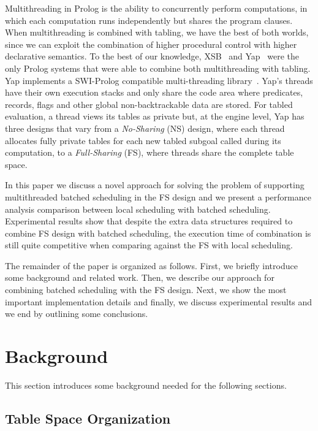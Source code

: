 \documentclass{llncs}
\begin{document}
Multithreading in Prolog is the ability to concurrently perform
computations, in which each computation runs independently but shares
the program clauses. When multithreading is combined with tabling, we
have the best of both worlds, since we can exploit the combination of
higher procedural control with higher declarative semantics. To the
best of our knowledge, XSB~\cite{Marques-08} and Yap~\cite{Areias-12a}
were the only Prolog systems that were able to combine both
multithreading with tabling. Yap implements a SWI-Prolog compatible
multi-threading library~\cite{Wielemaker-03}. Yap's threads have their
own execution stacks and only share the code area where predicates,
records, flags and other global non-backtrackable data are stored. For
tabled evaluation, a thread views its tables as private but, at the
engine level, Yap has three designs that vary from a \emph{No-Sharing}
(NS) design, where each thread allocates fully private tables for each
new tabled subgoal called during its computation, to a
\emph{Full-Sharing} (FS), where threads share the complete table
space.

In this paper we discuss a novel approach for solving the problem of
supporting multithreaded batched scheduling in the FS design and we
present a performance analysis comparison between local scheduling
with batched scheduling. Experimental results show that despite the
extra data structures required to combine FS design with batched
scheduling, the execution time of combination is still quite
competitive when comparing against the FS with local scheduling.

The remainder of the paper is organized as follows. First, we briefly
introduce some background and related work. Then, we describe our
approach for combining batched scheduling with the FS design. Next, we
show the most important implementation details and finally, we discuss
experimental results and we end by outlining some conclusions.

\section{Background}

This section introduces some background needed for the following
sections. 

\subsection{Table Space Organization}
\end{document}
